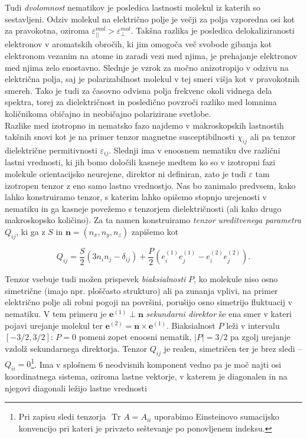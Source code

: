 \documentclass[longbibliography,slovene,a4paper,12pt]{book}
\newcommand{\tr}{\text{ Tr }}
\begin{document}
Tudi \emph{dvolomnost} nematikov je posledica lastnosti molekul iz katerih so sestavljeni. Odziv molekul na električno polje je večji za polja vzporedna osi kot za pravokotna, oziroma $\varepsilon_{||}^{mol} > \varepsilon_{\perp}^{mol}$. Takšna razlika je posledica delokaliziranosti elektronov v aromatskih obročih, ki jim omogoča več svobode gibanja kot elektronom vezanim na atome in zaradi vezi med njima, je prehajanje elektronov med njima zelo enostavno. Slednje je vzrok za močno anizotropijo v odzivu na električna polja, saj je polarizabilnost molekul v tej smeri višja kot v pravokotnih smereh. Tako je tudi za časovno odvisna polja frekvenc okoli vidnega dela spektra, torej za dielektričnost in posledično povzroči razliko med lomnima količnikoma običajno in neobičajno polarizirane svetlobe.\\

Razlike med izotropno in nematsko fazo najdemo v makroskopskih lastnostih takšnih snovi kot je na primer tenzor magnetne susceptibilnosti $\chi_{ij}$ ali pa tenzor dielektrične permitivnosti $\varepsilon_{ij}$. Slednji ima v enoosnem nematiku dve različni lastni vrednosti, ki jih bomo določili kasneje medtem ko so v izotropni fazi molekule orientacijsko neurejene, direktor ni definiran, zato je tudi $\varepsilon$ tam izotropen tenzor z eno samo lastno vrednostjo. Nas bo zanimalo predvsem, kako lahko konstruiramo tenzor, s katerim lahko opišemo stopnjo urejenosti v nematiku in ga kasneje povežemo s tenzorjem dielektričnosti (ali kako drugo makroskopsko količino). Za ta namen konstruiramo \emph{tenzor ureditvenega parametra} $Q_{ij}$, ki ga z $S$ in $\mathbf{n} = (n_x, n_y, n_z)$ zapišemo kot

\begin{equation}
Q_{ij} = \frac{S}{2}(3n_in_j-\delta_{ij}) + \frac{P}{2}\left (e_i ^{(1)}e_j^{(1)} - e_i^{(2)}e_j^{(2)} \right ).
\label{orderparametertensor}
\end{equation}

Tenzor vsebuje tudi možen prispevek \emph{biaksialnosti} $P$, ko molekule niso osno simetrične (imajo npr. ploščasto strukturo) ali pa zunanja vplivi, na primer električno polje ali robni pogoji na površini, porušijo osno simetrijo fluktuacij v nematiku. V tem primeru je $\mathbf{e}^{(1)} \perp \mathbf{n}$ \emph{sekundarni direktor} še ena smer v kateri pojavi urejanje molekul ter $\mathbf{e}^{(2)} = \mathbf{n} \times \mathbf{e}^{(1)}$. Biaksialnost $P$ leži v intervalu $[-3/2,3/2]$: $P=0$ pomeni zopet enoosni nematik, $|P|=3/2$ pa zgolj urejanje vzdolž sekundarnega direktorja. Tenzor $Q_{ij}$ je realen, simetričen ter je brez sledi -- $Q_{ii} = 0$\footnote{Pri zapisu sledi tenzorja $\tr A = A_{ii}$ uporabimo Einsteinovo sumacijsko konvencijo pri kateri je privzeto seštevanje po ponovljenem indeksu.}. Ima v splošnem 6 neodvisnih komponent vedno pa je moč najti osi koordinatnega sistema, oziroma lastne vektorje, v katerem je diagonalen in na njegovi diagonali ležijo lastne vrednosti
\end{document}
